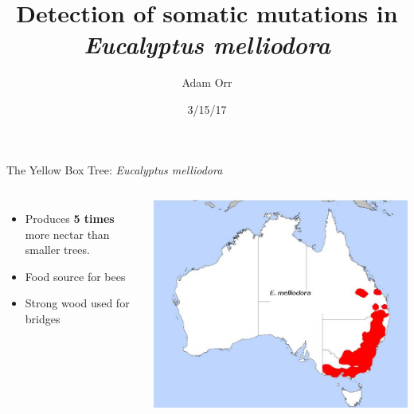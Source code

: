 \documentclass{beamer}
\title[Detecting Somatic Mutations]{Detection of somatic mutations in \textit{Eucalyptus melliodora}}
\date{3/15/17}
\author{Adam Orr}
\begin{document}
\frame{\titlepage}
\begin{frame}{The Yellow Box Tree: \textit{Eucalyptus melliodora}}

\begin{columns}
\begin{itemize}
\item Produces \textbf{5 times} more nectar than smaller trees.
\item Food source for bees
\item Strong wood used for bridges
\end{itemize}
\includegraphics[width=\linewidth]{figures/map.jpg}\footnotemark
\end{columns}
\end{frame}
\end{document}
